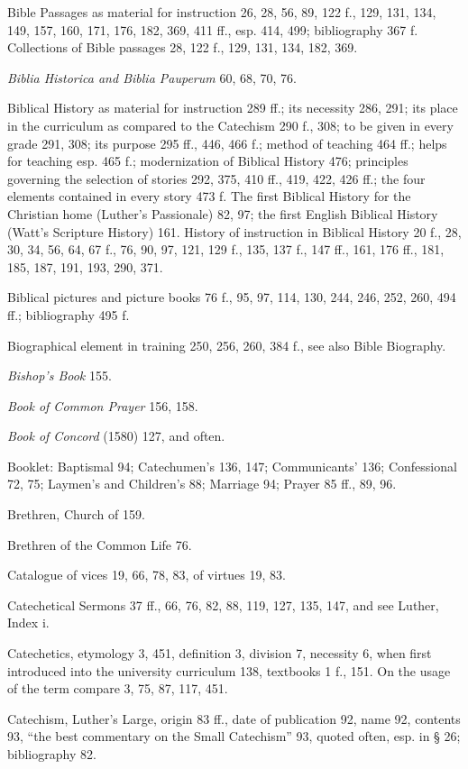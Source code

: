 Bible Passages as material for instruction 26, 28, 56, 89, 122 f., 129, 131, 134, 149, 157, 160, 171, 176, 182, 369, 411 ff., esp. 414, 499; bibliography 367 f. Collections of Bible passages 28, 122 f., 129, 131, 134, 182, 369.

\emph{Biblia Historica and Biblia Pauperum} 60, 68, 70, 76.

Biblical History as material for instruction 289 ff.; its necessity 286, 291; its place in the curriculum as compared to the Catechism 290 f., 308; to be given in every grade 291, 308; its purpose 295 ff., 446, 466 f.; method of teaching 464 ff.; helps for teaching esp. 465 f.; modernization of Biblical History 476; principles governing the selection of stories 292, 375, 410 ff., 419, 422, 426 ff.; the four elements contained in every story 473 f. The first Biblical History for the Christian home (Luther’s Passionale) 82, 97; the first English Biblical History (Watt’s Scripture History) 161. History of instruction in Biblical History 20 f., 28, 30, 34, 56, 64, 67 f., 76, 90, 97, 121, 129 f., 135, 137 f., 147 ff., 161, 176 ff., 181, 185, 187, 191, 193, 290, 371.

Biblical pictures and picture books 76 f., 95, 97, 114, 130, 244, 246, 252, 260, 494 ff.; bibliography 495 f.

Biographical element in training 250, 256, 260, 384 f., see also Bible Biography.

\emph{Bishop’s Book} 155.

\emph{Book of Common Prayer} 156, 158.

\emph{Book of Concord} (1580) 127, and often.

Booklet: Baptismal 94; Catechumen’s 136, 147; Communicants’ 136; Confessional 72, 75; Laymen’s and Children’s 88; Marriage 94; Prayer 85 ff., 89, 96.

Brethren, Church of 159.

Brethren of the Common Life 76.

Catalogue of vices 19, 66, 78, 83, of virtues 19, 83.

Catechetical Sermons 37 ff., 66, 76, 82, 88, 119, 127, 135, 147, and see Luther, Index i.

Catechetics, etymology 3, 451, definition 3, division 7, necessity 6, when first introduced into the university curriculum 138, textbooks 1 f., 151. On the usage of the term compare 3, 75, 87, 117, 451.

Catechism, Luther’s Large, origin 83 ff., date of publication 92, name 92, contents 93, “the best commentary on the Small Catechism” 93, quoted often, esp. in § 26; bibliography 82.

